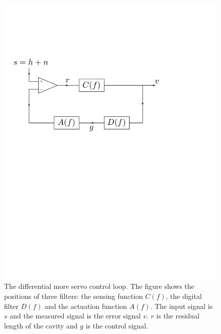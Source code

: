 \begin{figure}[p]
\label{f:darmloop}
\begin{center}
\includegraphics[width=\linewidth]{figures/inspiral/darm}
\end{center}
\caption[Differential mode control servo loop]{%
The differential more servo control loop. The figure shows the positions of
three filters: the sensing function $C(f)$, the digital filter $D(f)$ and
the actuation function $A(f)$. The input signal is $s$ and the measured signal
is the error signal $v$. $r$ is the residual length of the cavity and $g$ is
the control signal.
}
\end{figure}


